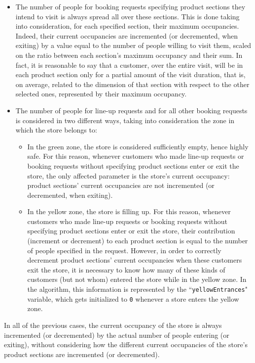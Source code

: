 \documentclass[a4paper,oneside,11pt]{book}
\begin{document}
    \begin{itemize}
        \item The number of people for booking requests specifying product sections they intend to visit is always spread all over these sections. This is done taking into consideration, for each specified section, their maximum occupancies. Indeed, their current occupancies are incremented (or decremented, when exiting) by a value equal to the number of people willing to visit them, scaled on the ratio between each section’s maximum occupancy and their sum. In fact, it is reasonable to say that a customer, over the entire visit, will be in each product section only for a partial amount of the visit duration, that is, on average, related to the dimension of that section with respect to the other selected ones, represented by their maximum occupancy. 
        \item The number of people for line-up requests and for all other booking requests is considered in two different ways, taking into consideration the zone in which the store belongs to:
        \begin{itemize}
            \item In the green zone, the store is considered sufficiently empty, hence highly safe. For this reason, whenever customers who made line-up requests or booking requests without specifying product sections enter or exit the store, the only affected parameter is the store’s current occupancy: product sections’ current occupancies are not incremented (or decremented, when exiting).
            \item In the yellow zone, the store is filling up. For this reason,  whenever customers who made line-up requests or booking requests without specifying product sections enter or exit the store, their contribution (increment or decrement) to each product section is equal to the number of people specified in the request. However, in order to correctly decrement product sections’ current occupancies when these customers exit the store, it is necessary to know how many of these kinds of customers (but not whom) entered the store while in the yellow zone. In the algorithm, this information is represented by the ``\texttt{yellowEntrances}" variable, which gets initialized to \texttt{0} whenever a store enters the yellow zone.
        \end{itemize}
    \end{itemize}
    In all of the previous cases, the current occupancy of the store is always incremented (or decremented) by the actual number of people entering (or exiting), without considering how the different current occupancies of the store’s product sections are incremented (or decremented). \par
\end{document}
